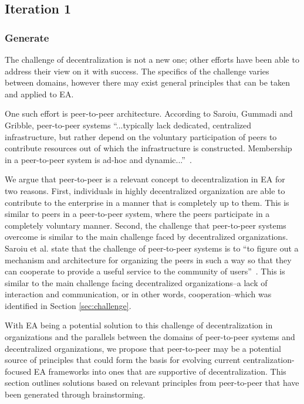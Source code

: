 \subsection{Iteration 1}

\subsubsection*{Generate}

The challenge of decentralization is not a new one; other efforts have been able to address their view on it with success. The specifics of the challenge varies between domains, however there may exist general principles that can be taken and applied to EA. 

One such effort is peer-to-peer architecture. According to Saroiu, Gummadi and Gribble, peer-to-peer systems ``...typically lack dedicated, centralized infrastructure, but rather depend on the voluntary participation of peers to contribute resources out of which the infrastructure is constructed. Membership in a peer-to-peer system is ad-hoc and dynamic...''~\cite{saroiu2001measurement}. 


We argue that peer-to-peer is a relevant concept to decentralization in EA for two reasons. First, individuals in highly decentralized organization are able to contribute to the enterprise in a manner that is completely up to them. This is similar to peers in a peer-to-peer system, where the peers participate in a completely voluntary manner. Second, the challenge that peer-to-peer systems overcome is similar to the main challenge faced by decentralized organizations. Saroiu et al. state that the challenge of peer-to-peer systems is to ``to figure out a mechanism and architecture for organizing the peers in such a way so that they can cooperate to provide a useful service to the community of users''~\cite{saroiu2001measurement}. This is similar to the main challenge facing decentralized organizations--a lack of interaction and communication, or in other words, cooperation--which was identified in Section \ref{sec:challenge}. 

With EA being a potential solution to this challenge of decentralization in organizations and the parallels between the domains of peer-to-peer systems and decentralized organizations, we propose that peer-to-peer may be a potential source of principles that could form the basis for evolving current centralization-focused EA frameworks into ones that are supportive of decentralization. This section outlines solutions based on relevant principles from peer-to-peer that have been generated through brainstorming.

